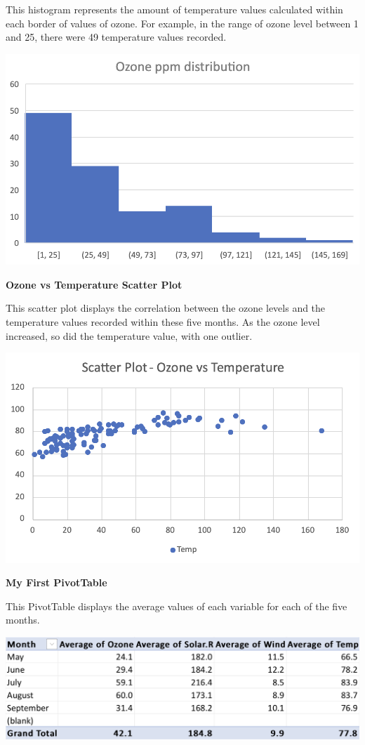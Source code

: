 \documentclass[
  letterpaper,
  DIV=11,
  numbers=noendperiod]{scrreprt}
\begin{document}
This histogram represents the amount of temperature values calculated
within each border of values of ozone. For example, in the range of
ozone level between 1 and 25, there were 49 temperature values recorded.

\includegraphics{Hist_Ozone_Pena.png}

\textbf{Ozone vs Temperature Scatter Plot}

This scatter plot displays the correlation between the ozone levels and
the temperature values recorded within these five months. As the ozone
level increased, so did the temperature value, with one outlier.

\includegraphics{Scat_Oz_Temp_Pena.png}

\textbf{My First PivotTable}

This PivotTable displays the average values of each variable for each of
the five months.

\includegraphics{PivotTable1_Summary_Variables_Pena.png}
\end{document}
